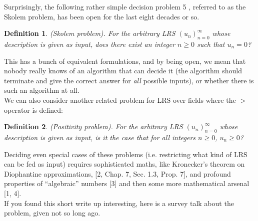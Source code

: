 \documentclass[a4paper,12pt]{article}
\newtheorem{definition}{Definition}
\numberwithin{definition}{section}
\numberwithin{mytheorem}{subsection}
\begin{document}
Surprisingly, the following rather simple decision problem 5 , referred to as the Skolem problem,
has been open for the last eight decades or so.\\

\begin{definition}
\emph{(Skolem problem)}. For the arbitrary LRS $(u_n)^\infty_{n=0}$ whose description is given as
input, does there exist an integer $n \geq 0$ such that $u_n = 0$?
\end{definition}
This has a bunch of equivalent formulations, and by being open, we mean that nobody really knows of an algorithm that can decide it (the algorithm should terminate and give the correct
answer for \emph{all} possible inputs), or whether there is such an algorithm at all.\\
We can also consider another related problem for LRS over fields where the $>$ operator is defined:\\
\begin{definition}
\emph{(Positivity problem)}. For the arbitrary LRS $(u_n)^\infty_{n=0}$ whose description is given as
input, is it the case that for all integers $n \geq 0$, $u_n \geq 0$?
\end{definition}
Deciding even special cases of these problems (i.e. restricting what kind of LRS can be fed as
input) requires sophisticated maths, like Kronecker’s theorem on Diophantine approximations, [2,
Chap. 7, Sec. 1.3, Prop. 7], and profound properties of “algebraic” numbers [3] and then some
more mathematical arsenal [1, 4].\\
If you found this short write up interesting, here is a survey talk about the problem, given not so
long ago.
\newpage
\end{document}
